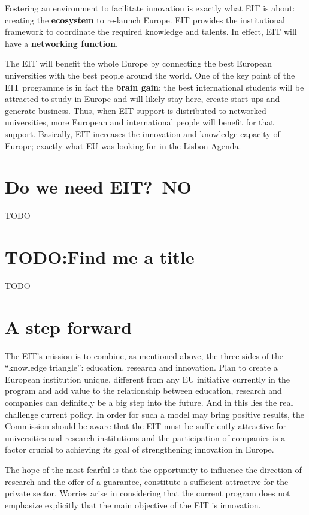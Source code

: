 \documentclass[11pt,a4paper,oneside,twocolumn]{IEEEtran}
\begin{document}
Fostering an environment to facilitate innovation is exactly what EIT is about: creating the \textbf{ecosystem} to re-launch Europe. EIT provides the institutional framework to coordinate the required knowledge and talents. In effect, EIT will have a \textbf{networking function}.

The EIT will benefit the whole Europe by connecting the best European universities with the best people around the world. One of the key point of the EIT programme is in fact the \textbf{brain gain}: the best international students will be attracted to study in Europe and will likely stay here, create start-ups and generate business. Thus, when EIT support is distributed to networked universities, more European and international people will benefit for that support. Basically, EIT increases the innovation and knowledge capacity of Europe; exactly what EU was looking for in the Lisbon Agenda.


\section{Do we need EIT?\ NO}
TODO
\section{TODO:Find me a title}
TODO

\section{A step forward}
The EIT's mission is to combine, as mentioned above, the three sides of the ``knowledge triangle'': education, research and innovation.
Plan to create a European institution unique, different from any EU initiative currently in the program and add value to the relationship between education, research and companies can definitely be a big step into the future. And in this lies the real challenge current policy.
In order for such a model may bring positive results, the Commission should be aware that the EIT must be sufficiently attractive for universities and research institutions and the participation of companies is a factor crucial to achieving its goal of strengthening innovation in Europe.

The hope of the most fearful is that the opportunity to influence the direction of research and the offer of a guarantee, constitute a sufficient attractive for the private sector.
Worries arise in considering that the current program does not emphasize explicitly that the main objective of the EIT is innovation.
\end{document}
